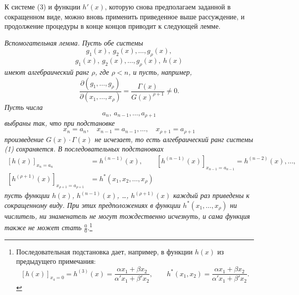 \documentclass[11pt]{article}
\begin{document}
К системе (3) и функции $h'(x)$, которую снова предполагаем заданной в сокращенном виде, можно вновь применить приведенное выше рассуждение, и продолжение процедуры в конце концов приводит к следующей лемме.

\emph{Вспомогательная лемма. Пусть обе системы}
\[
  g_1(x),\ g_2(x),\ldots,g_\rho(x),
\]
\[
  g_1(x),\ g_2(x),\ldots,g_\rho(x),\ h(x)
\]
\emph{имеют алгебраический ранг $\rho$, где $\rho<n$, и пусть, например,}
\[
 \frac{\partial(g_1,\ldots,g_\rho)}{\partial(x_1,
\ldots,x_\rho)}
 =\frac{\Gamma(x)}{G(x)^{\rho+1}}\ne0.
\]
\emph{Пусть числа}
\[
  a_n,\ a_{n-1},\ldots,a_{\rho+1}
\]
\emph{выбраны так, что при подстановке}
\[
  x_n=a_n,\quad x_{n-1}=a_{n-1},\ldots,\quad x_{\rho+1}=a_{\rho+1}
\]
\emph{произведение $G(x)\cdot\Gamma(x)$ не исчезает, то есть алгебраический ранг системы (1) сохраняется. В последовательных подстановках}
\[
\begin{aligned}
 [h(x)]_{x_n=a_n}&=h^{(n-1)}(x),\qquad
 [h^{(n-1)}(x)]_{x_{n-1}=a_{n-1}}=h^{(n-2)}(x),\ldots,\\
 [h^{(\rho+1)}(x)]_{x_{\rho+1}=a_{\rho+1}}&=h^*(x_1,x_2,\ldots,x_\rho)
\end{aligned}
\]
\emph{пусть функции $h(x)$, $h^{(n-1)}(x)$, \ldots, $h^{(\rho+1)}(x)$ каждый раз приведены к сокращенному виду. При этих предположениях в функции $h^*(x_1,\ldots,x_\rho)$ ни числитель, ни знаменатель не могут тождественно исчезнуть, и сама функция также не может стать $\frac{0}{0}$.}\footnote{Последовательная подстановка дает, например, в функции $h(x)$ из предыдущего примечания:
\[
 [h(x)]_{x_4=0}=h^{(3)}(x)=\frac{\alpha x_1+\beta x_2}{\alpha' x_1+\beta' x_2},\qquad
 h^*(x_1,x_2)=\frac{\alpha x_1+\beta x_2}{\alpha' x_1+\beta' x_2}.
\]}
\end{document}
